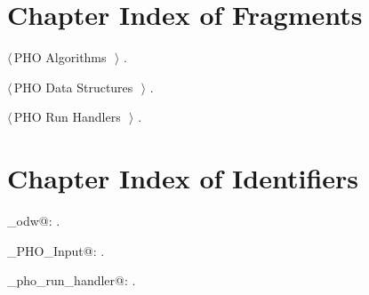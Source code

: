 \documentclass[12.0pt]{report}
\begin{document}
\section{Chapter Index of Fragments}

{\small\begin{list}{}{\setlength{\itemsep}{-\parsep}\setlength{\itemindent}{-\leftmargin}}
\item $\langle\,$PHO Algorithms\nobreak\ {\footnotesize {}}$\,\rangle$ {\footnotesize {\NWtxtRefIn} .}
\item $\langle\,$PHO Data Structures\nobreak\ {\footnotesize {}}$\,\rangle$ {\footnotesize {\NWtxtRefIn} .}
\item $\langle\,$PHO Run Handlers\nobreak\ {\footnotesize {}}$\,\rangle$ {\footnotesize {\NWtxtRefIn} .}
\end{list}}
\section{Chapter Index of Identifiers}

{\small\begin{list}{}{\setlength{\itemsep}{-\parsep}\setlength{\itemindent}{-\leftmargin}}
\item \verb@algo_odw@: \underline{}.
\item \verb@Single_PHO_Input@: \underline{}.
\item \verb@single_pho_run_handler@: \underline{}.
\end{list}} 
\nocite{*} %
 

\end{document}
